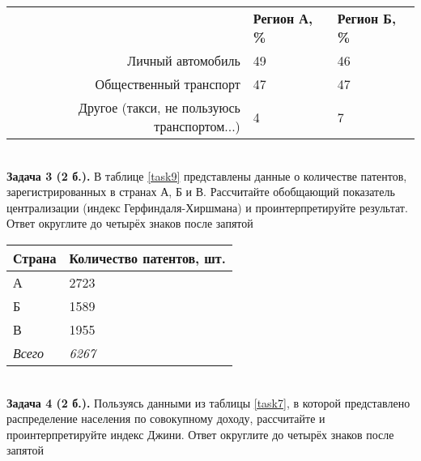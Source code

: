 \documentclass{article}
\begin{document}
\begin{minipage}{\textwidth}
\centering
\begin{tabularx}{0.7\textwidth}{rYY}
\toprule
 & \textbf{Регион А, \%} & \textbf{Регион Б, \%} \\
\cmidrule(lr){2-2}\cmidrule(lr){3-3}
Личный автомобиль & 49 & 46 \\

Общественный транспорт & 47 & 47 \\

Другое (такси, не пользуюсь транспортом...) & 4 & 7 \\
\bottomrule
\end{tabularx}
\label{task5}
\end{minipage} \\[35pt]

\textbf{Задача 3 (2 б.).} В таблице \ref{task9} представлены данные о количестве патентов, зарегистрированных в странах А, Б и В. Рассчитайте обобщающий показатель централизации (индекс Герфиндаля-Хиршмана) и проинтерпретируйте результат. Ответ округлите до четырёх знаков после запятой\\

\begin{minipage}{\textwidth}
\centering
\begin{tabularx}{0.4\textwidth}{YY}
\toprule
\textbf{Страна} & \textbf{Количество патентов, шт.} \\
\midrule
А & 2723 \\

Б & 1589 \\

В & 1955 \\
\addlinespace
\textit{Всего} & \textit{6267} \\
\bottomrule
\end{tabularx}
\label{task9}
\end{minipage} \\[35pt]

\textbf{Задача 4 (2 б.).} Пользуясь данными из таблицы \ref{task7}, в которой представлено распределение населения по совокупному доходу, рассчитайте и проинтерпретируйте индекс Джини. Ответ округлите до четырёх знаков после запятой\\
\end{document}
